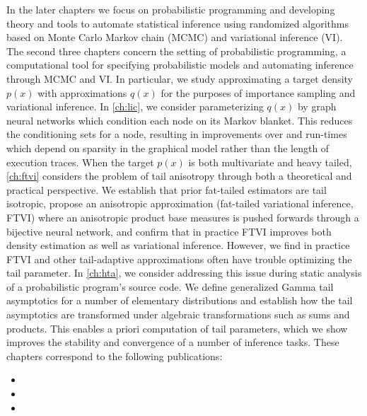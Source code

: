 \documentclass[thesis.tex]{subfiles}
\begin{document}
In the later chapters we focus on probabilistic programming and developing theory and tools
to automate statistical inference using randomized algorithms based on
Monte Carlo Markov chain (MCMC) and variational inference (VI).
The second three chapters concern the setting of probabilistic programming, a computational tool
for specifying probabilistic models and automating inference through MCMC and VI. In particular, we
study approximating a target density $p(x)$ with approximations $q(x)$ for the purposes of
importance sampling and variational inference.
In \cref{ch:lic}, we consider parameterizing $q(x)$ by graph neural networks which condition each
node on its Markov blanket. This reduces the conditioning sets for a node, resulting in improvements over
\cite{le2017inference} and run-times which depend on sparsity in the graphical model rather than
the length of execution traces.
When the target $p(x)$ is both multivariate and heavy tailed, \cref{ch:ftvi}
considers the problem of tail anisotropy through both a theoretical and practical perspective.
We establish that prior fat-tailed estimators \citep{jaini2020tails} are tail isotropic, propose
an anisotropic approximation (fat-tailed variational inference, FTVI) where
an anisotropic product base measures is pushed forwards through a bijective neural network,
and confirm that in practice FTVI improves both density estimation as well as variational inference.
However, we find in practice FTVI and other tail-adaptive approximations often have trouble optimizing
the tail parameter. In \cref{ch:hta}, we consider addressing this issue during static analysis of a
probabilistic program's source code. We define generalized Gamma tail asymptotics for a number of
elementary distributions and establish how the tail asymptotics are transformed under algebraic transformations
such as sums and products. This enables a priori computation of tail parameters, which we show
improves the stability and convergence of a number of inference tasks.
These chapters correspond to the following publications:
\begin{itemize}
    \item {}
    \item {}
    \item {}
\end{itemize}
\end{document}
